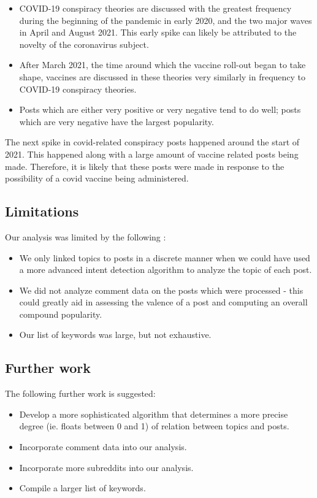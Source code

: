 \documentclass[fontsize=11pt]{article}
\begin{document}
\begin{itemize}
    \item COVID-19 conspiracy theories are discussed with the greatest frequency during the beginning of the pandemic in early 2020, and the two major waves in April and August 2021. This early spike can likely be attributed to the novelty of the coronavirus subject.
    \item After March 2021, the time around which the vaccine roll-out began to take shape, vaccines are discussed in these theories very similarly in frequency to COVID-19 conspiracy theories.
    \item Posts which are either very positive or very negative tend to do well; posts which are very negative have the largest popularity.
\end{itemize}

The next spike in covid-related conspiracy posts happened around the start of 2021. This happened along with a large amount of vaccine related posts being made. Therefore, it is likely that these posts were made in response to the possibility of a covid vaccine being administered. 

\subsection{Limitations}
Our analysis was limited by the following :
\begin{itemize}
    \item We only linked topics to posts in a discrete manner when we could have used a more advanced intent detection algorithm to analyze the topic of each post.
    \item We did not analyze comment data on the posts which were processed - this could greatly aid in assessing the valence of a post and computing an overall compound popularity.
    \item Our list of keywords was large, but not exhaustive.
\end{itemize}

\subsection{Further work}

The following further work is suggested:

\begin{itemize}
    \item Develop a more sophisticated algorithm that determines a more precise degree (ie. floats between 0 and 1) of relation between topics and posts.
    \item Incorporate comment data into our analysis.
    \item Incorporate more subreddits into our analysis.
    \item Compile a larger list of keywords.
\end{itemize}

\printbibliography
\end{document}
